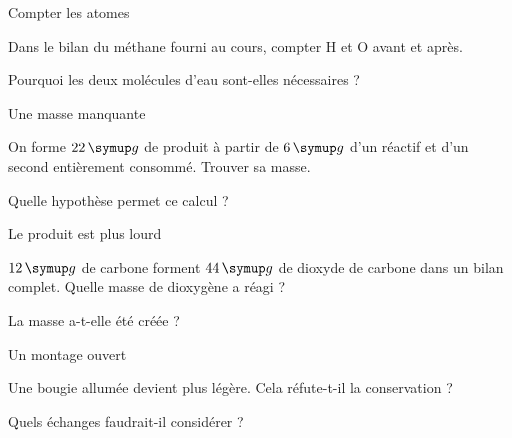\par\noindent\begin{minipage}{\linewidth}
\begin{exercice}[2]{Compter les atomes}
\begin{questions}
\item Dans le bilan du méthane fourni au cours, compter H et O avant et après.
\item Pourquoi les deux molécules d’eau sont-elles nécessaires ?
\end{questions}
\end{exercice}
\end{minipage}
\par\noindent\begin{minipage}{\linewidth}
\begin{exercice}[2]{Une masse manquante}
\begin{questions}
\item On forme $22\unite g$ de produit à partir de $6\unite g$ d’un réactif et d’un second entièrement consommé. Trouver sa masse.
\item Quelle hypothèse permet ce calcul ?
\end{questions}
\end{exercice}
\end{minipage}
\par\noindent\begin{minipage}{\linewidth}
\begin{exercice}[2]{Le produit est plus lourd}
\begin{questions}
\item $12\unite g$ de carbone forment $44\unite g$ de dioxyde de carbone dans un bilan complet. Quelle masse de dioxygène a réagi ?
\item La masse a-t-elle été créée ?
\end{questions}
\end{exercice}
\end{minipage}
\par\noindent\begin{minipage}{\linewidth}
\begin{exercice}[2]{Un montage ouvert}
\begin{questions}
\item Une bougie allumée devient plus légère. Cela réfute-t-il la conservation ?
\item Quels échanges faudrait-il considérer ?
\end{questions}
\end{exercice}
\end{minipage}
